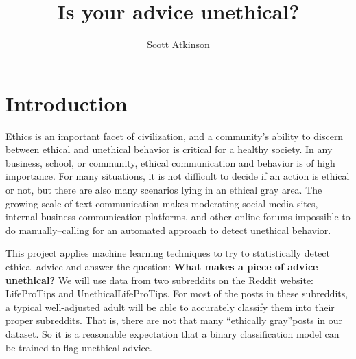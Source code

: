 \documentclass{amsart}
\theoremstyle{definition}
\theoremstyle{remark}
\newcommand{\tql}{\textquotedblleft}
\newcommand{\tqr}{\textquotedblright}
\begin{document}
   \def\lfhook#1{\setbox0=\hbox{#1}{\ooalign{\hidewidth
    \lower1.5ex\hbox{'}\hidewidth\crcr\unhbox0}}} 
\title{Is your advice unethical?}
\author{Scott Atkinson}


\maketitle

\section{Introduction}

Ethics is an important facet of civilization, and a community's ability to discern between ethical and unethical behavior is critical for a healthy society.  In any business, school, or community, ethical communication and behavior is of high importance. For many situations, it is not difficult to decide if an action is ethical or not, but there are also many scenarios lying in an ethical gray area.  The growing scale of text communication makes moderating social media sites, internal business communication platforms, and other online forums impossible to do manually--calling for an automated approach to detect unethical behavior. 

This project applies machine learning techniques to try to statistically detect ethical advice and answer the question: \textbf{What makes a piece of advice unethical?}  
We will use data from two subreddits on the Reddit website: LifeProTips and UnethicalLifeProTips.  For most of the posts in these subreddits, a typical well-adjusted adult will be able to accurately classify them into their proper subreddits. That is, there are not that many \tql ethically gray\tqr posts in our dataset.  So it is a reasonable expectation that a binary classification model can be trained to flag unethical advice. 
\end{document}
